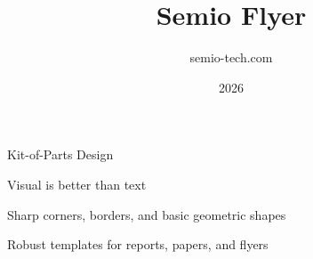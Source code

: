 \documentclass[type=flyer,theme=light,language=de]{semio}
\title{Semio Flyer}
\author{semio-tech.com}
\date{2026}
\begin{document}
\maketitle

\begin{Semiobox}
  \centering
  {\SemioSerif\Large Kit-of-Parts Design\par}
  \vspace{\SemioSpacingTouch}
  {\SemioSans Visual is better than text\par}
  \semioemblem[3cm]
\end{Semiobox}

\vfill
\begin{minipage}[t]{0.48\linewidth}
  \begin{Semiobox}[title=Design]
    Sharp corners, borders, and basic geometric shapes
  \end{Semiobox}
\end{minipage}\hfill
\begin{minipage}[t]{0.48\linewidth}
  \begin{Semiobox}[title=Build]
    Robust templates for reports, papers, and flyers
  \end{Semiobox}
\end{minipage}
\end{document}
